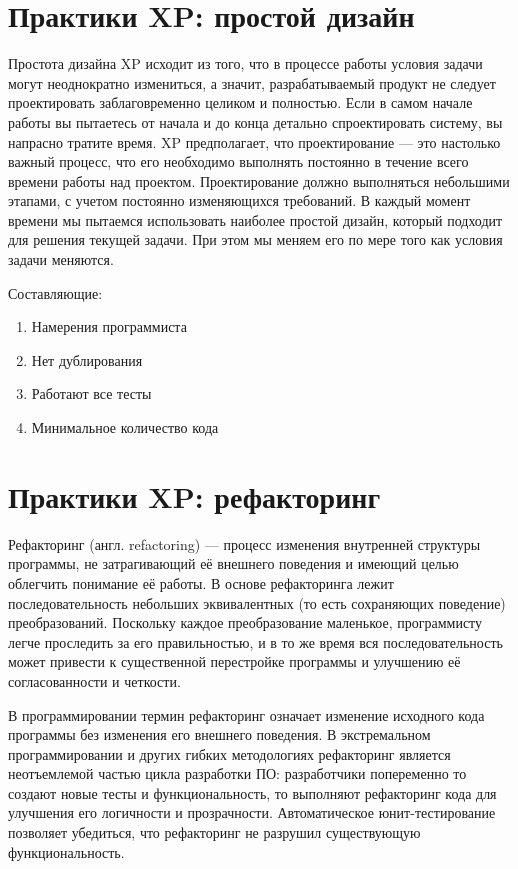 \documentclass{article}
\let\stdsection\section
\renewcommand\section{\newpage\stdsection}
\begin{document}
\section{Практики XP: простой дизайн}
    Простота дизайна XP исходит из того, что в процессе работы условия задачи могут неоднократно измениться, а значит, разрабатываемый продукт не следует проектировать заблаговременно целиком и полностью. Если в самом начале работы вы пытаетесь от начала и до конца детально спроектировать систему, вы напрасно тратите время. XP предполагает, что проектирование — это настолько важный процесс, что его необходимо выполнять постоянно в течение всего времени работы над проектом. Проектирование должно выполняться небольшими этапами, с учетом постоянно изменяющихся требований. В каждый момент времени мы пытаемся использовать наиболее простой дизайн, который подходит для решения текущей задачи. При этом мы меняем его по мере того как условия задачи меняются.

    Составляющие:
    \begin{enumerate}
        \item Намерения программиста
        \item Нет дублирования
        \item Работают все тесты
        \item Минимальное количество кода
    \end{enumerate}

\section{Практики XP: рефакторинг}
    Рефакторинг (англ. refactoring) — процесс изменения внутренней структуры программы, не затрагивающий её внешнего поведения и имеющий целью облегчить понимание её работы. В основе рефакторинга лежит последовательность небольших эквивалентных (то есть сохраняющих поведение) преобразований. Поскольку каждое преобразование маленькое, программисту легче проследить за его правильностью, и в то же время вся последовательность может привести к существенной перестройке программы и улучшению её согласованности и четкости.

    В программировании термин рефакторинг означает изменение исходного кода программы без изменения его внешнего поведения. В экстремальном программировании и других гибких методологиях рефакторинг является неотъемлемой частью цикла разработки ПО: разработчики попеременно то создают новые тесты и функциональность, то выполняют рефакторинг кода для улучшения его логичности и прозрачности. Автоматическое юнит-тестирование позволяет убедиться, что рефакторинг не разрушил существующую функциональность.
\end{document}
